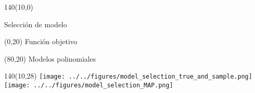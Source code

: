 \documentclass[shownotes,aspectratio=169]{beamer}
\begin{document}
\begin{frame}[plain]
\begin{textblock}{140}(10,0)
 \begin{center}
  \Large Selecci\'on de modelo
 \end{center}
\end{textblock}

\begin{textblock}{80}(0,20)
 \centering
Funci\'on objetivo
\end{textblock}

\begin{textblock}{80}(80,20)
 \centering
 Modelos polinomiales
\end{textblock}

\begin{textblock}{140}(10,28)
     \centering 
       \texttt{[image: ../../figures/model\_selection\_true\_and\_sample.png]} 
       \texttt{[image: ../../figures/model\_selection\_MAP.png]} 
\end{textblock}

\end{frame}
\end{document}
